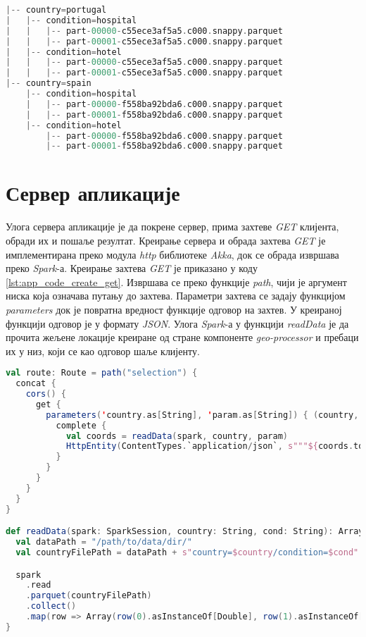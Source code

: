 \documentclass[12pt,oneside]{memoir}
\begin{document}
\begin{lstlisting}[caption={Структура директоријума партиционисаног по државама и врстама локација}, language=Scala, label={lst:app_code_partition_by_countries}]
|-- country=portugal
|   |-- condition=hospital
|   |   |-- part-00000-c55ece3af5a5.c000.snappy.parquet
|   |   |-- part-00001-c55ece3af5a5.c000.snappy.parquet
|   |-- condition=hotel
|   |   |-- part-00000-c55ece3af5a5.c000.snappy.parquet
|   |   |-- part-00001-c55ece3af5a5.c000.snappy.parquet
|-- country=spain
    |-- condition=hospital
    |   |-- part-00000-f558ba92bda6.c000.snappy.parquet
    |   |-- part-00001-f558ba92bda6.c000.snappy.parquet
    |-- condition=hotel
        |-- part-00000-f558ba92bda6.c000.snappy.parquet
        |-- part-00001-f558ba92bda6.c000.snappy.parquet
\end{lstlisting}

\section{Сервер апликације}
\label{sec:app_server}

Улога сервера апликације је да покрене сервер, прима захтеве \textit{GET} клијента, обради их и пошаље резултат. Креирање сервера и обрада захтева \textit{GET} је имплементирана преко модула \textit{http} библиотеке \textit{Akka}, док се обрада извршава преко \textit{Spark}-а. Креирање захтева \textit{GET} је приказано у коду \ref{lst:app_code_create_get}. Извршава се преко функције \textit{path}, чији је аргумент ниска која означава путању до захтева. Параметри захтева се задају функцијом \textit{parameters} док је повратна вредност функције одговор на захтев. У креираној функцији одговор је у формату \textit{JSON}. Улога \textit{Spark}-а у функцији \textit{readData} је да прочита жељене локације креиране од стране компоненте \textit{geo-processor} и пребаци их у низ, који се као одговор шаље клијенту.

\begin{lstlisting}[caption={Имплементација функције која прима и обрађује захтев \textit{GET}}, language=Scala, label={lst:app_code_create_get}]
val route: Route = path("selection") {
  concat {
    cors() {
      get {
        parameters('country.as[String], 'param.as[String]) { (country, param) =>
          complete {
            val coords = readData(spark, country, param)
            HttpEntity(ContentTypes.`application/json`, s"""${coords.toJson}""")
          }
        }
      }
    }
  }
}

def readData(spark: SparkSession, country: String, cond: String): Array[Array[Double]] = {
  val dataPath = "/path/to/data/dir/"
  val countryFilePath = dataPath + s"country=$country/condition=$cond"

  spark
    .read
    .parquet(countryFilePath)
    .collect()
    .map(row => Array(row(0).asInstanceOf[Double], row(1).asInstanceOf[Double]))
}
\end{lstlisting}
\end{document}
